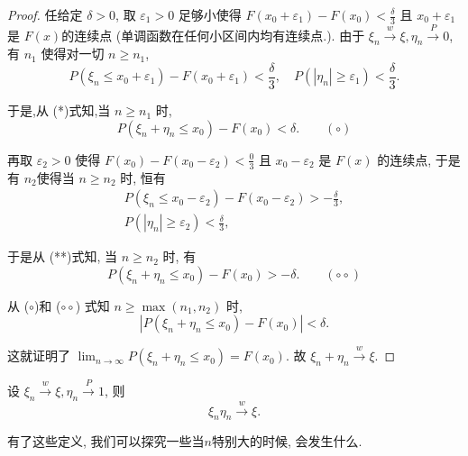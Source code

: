 {{\begin{proof}
任给定 $\delta>0$, 取 $\varepsilon_1>0$ 足够小使得 $F\left(x_0+\varepsilon_1\right)-F\left(x_0\right)<\frac{\delta}{3}$ 且 $x_0+\varepsilon_1$ 是 $F(x)$的连续点 (单调函数在任何小区间内均有连续点.). 由于 $\xi_n \stackrel{w}{\longrightarrow} \xi, \eta_n \stackrel{P}{\longrightarrow} 0$, 有 $n_1$ 使得对一切 $n \geqslant n_1$,
$$
P\left(\xi_n \leqslant x_0+\varepsilon_1\right)-F\left(x_0+\varepsilon_1\right)<\frac{\delta}{3}, \quad P\left(\left|\eta_n\right| \geqslant \varepsilon_1\right)<\frac{\delta}{3} .
$$

于是,从 (*)式知,当 $n \geqslant n_1$ 时,
$$
P\left(\xi_n+\eta_n \leqslant x_0\right)-F\left(x_0\right)<\delta . \qquad (\circ)
$$

再取 $\varepsilon_2>0$ 使得 $F\left(x_0\right)-F\left(x_0-\varepsilon_2\right)<\frac{0}{3}$ 且 $x_0-\varepsilon_2$ 是 $F(x)$ 的连续点, 于是有 $n_2$使得当 $n \geqslant n_2$ 时, 恒有
$$
\begin{gathered}
P\left(\xi_n \leqslant x_0-\varepsilon_2\right)-F\left(x_0-\varepsilon_2\right)>-\frac{\delta}{3}, \\
P\left(\left|\eta_n\right| \geqslant \varepsilon_2\right)<\frac{\delta}{3},
\end{gathered}
$$

于是从 (**)式知, 当 $n \geqslant n_2$ 时, 有
$$
P\left(\xi_n+\eta_n \leqslant x_0\right)-F\left(x_0\right)>-\delta . \quad \quad (\circ\circ)
$$

从 ($\circ$)和 ($\circ\circ$) 式知 $n \geqslant \max \left(n_1, n_2\right)$ 时,
$$
\left|P\left(\xi_n+\eta_n \leqslant x_0\right)-F\left(x_0\right)\right|<\delta .
$$

这就证明了 $\lim _{n \rightarrow \infty} P\left(\xi_n+\eta_n \leqslant x_0\right)=F\left(x_0\right)$. 故 $\xi_n+\eta_n \stackrel{w}{\longrightarrow} \xi$.
\end{proof}
}}

\begin{theorem}
    设 $\xi_n \stackrel{w}{\longrightarrow} \xi, \eta_n \stackrel{P}{\longrightarrow} 1$, 则
$$
\xi_n \eta_n \stackrel{w}{\longrightarrow} \xi .
$$
\end{theorem}

有了这些定义, 我们可以探究一些当$n$特别大的时候, 会发生什么.